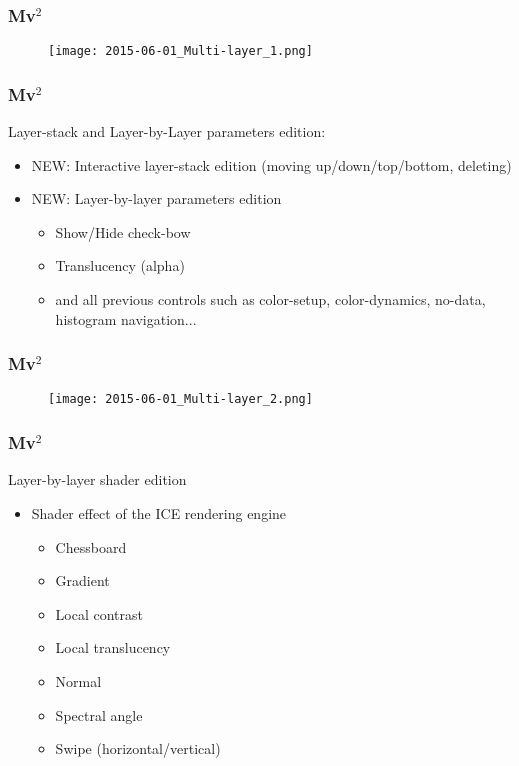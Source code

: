\documentclass[8pt]{beamer}
\begin{document}
\begin{frame}
\frametitle{Mv$^{2}$}
\begin{figure}[hbtp]
    \centering
    \texttt{[image: 2015-06-01\_Multi-layer\_1.png]} 
\end{figure}
\end{frame}

\begin{frame}
\frametitle{Mv$^{2}$}
 Layer-stack and Layer-by-Layer parameters edition:
\begin{itemize}
 \item NEW: Interactive layer-stack edition (moving up/down/top/bottom, deleting)
 \item NEW: Layer-by-layer parameters edition
 \begin{itemize}
  \item Show/Hide check-bow
  \item Translucency (alpha)
  \item and all previous controls such as color-setup, color-dynamics, no-data, histogram navigation...
 \end{itemize}
\end{itemize}
\end{frame}

\begin{frame}
\frametitle{Mv$^{2}$}
\begin{figure}[hbtp]
    \centering
    \texttt{[image: 2015-06-01\_Multi-layer\_2.png]} 
\end{figure}
\end{frame}

\begin{frame}
\frametitle{Mv$^{2}$}
Layer-by-layer shader edition
\begin{itemize}
 \item Shader effect of the ICE rendering engine
 \begin{itemize}
    \item Chessboard
    \item Gradient
    \item Local contrast
    \item Local translucency
    \item Normal
    \item Spectral angle
    \item Swipe (horizontal/vertical)
 \end{itemize}
\end{itemize}
\end{frame}
\end{document}
